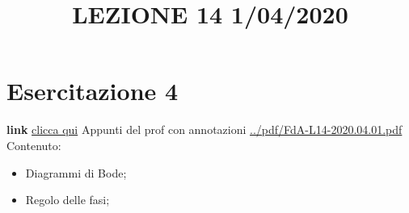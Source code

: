 \section{Esercitazione 4}
\title{LEZIONE 14 1/04/2020}\newline
\textbf{link} \href{https://web.microsoftstream.com/video/7cfe3714-fd1e-453f-8394-f7abd4d747ad?list=user&userId=faa91214-a6f5-40d7-8875-253fd49b8ce1}{clicca qui}\newline
\newline
Appunti del prof con annotazioni \url{../pdf/FdA-L14-2020.04.01.pdf}
Contenuto:
\begin{itemize}
    \item Diagrammi di Bode;
    \item Regolo delle fasi;
\end{itemize}